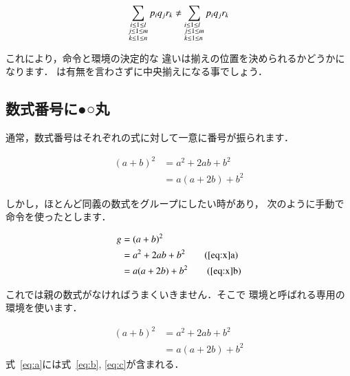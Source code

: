 \begin{inout}
\begin{inout}
\begin{displaymath}
\sum_{\substack{i\le 1\le l \\ j\le 1 
 \le m\\ k\le 1 \le n}} p_i q_j r_k \neq
 \sum_{\begin{subarray}{l} 
   i\le 1\le l \\ j\le 1 \le m  \\ 
  k\le 1 \le n\end{subarray}} 
  p_i q_j r_k 
\end{displaymath}  
\end{inout} 

これにより，命令と環境の決定的な
違いは揃えの位置を決められるかどうかになります．
は有無を言わさずに中央揃えになる事でしょう．


\subsection{数式番号に●○丸}

通常，数式番号はそれぞれの式に対して一意に番号が振られます．
\begin{inout}
\begin{align}
(a+b)^2 &= a^2+2ab+b^2 \\
        &= a(a+2b)+b^2  
\end{align}
\end{inout}

しかし，ほとんど同義の数式をグループにしたい時があり，
次のように手動で  命令を使ったとします．
\begin{inout}
\begin{align}
g &= (a+b)^2     \label{eq:x}\\
  &= a^2+2ab+b^2 \tag{\ref{eq:x}a}\\
  &= a(a+2b)+b^2 \tag{\ref{eq:x}b}
\end{align} 
\end{inout}
これでは親の数式がなければうまくいきません．そこで 
環境と呼ばれる専用の環境を使います．
\begin{inout}
\begin{subequations}\label{eq:a}
 \begin{align}
 (a+b)^2 &= a^2+2ab+b^2\label{eq:b}\\
         &= a(a+2b)+b^2\label{eq:c}
 \end{align} 
\end{subequations} 
式~\eqref{eq:a}には式~\eqref{eq:b},
\eqref{eq:c}が含まれる．
\end{inout}


\end{inout}
